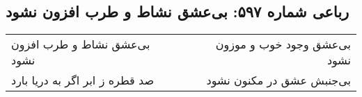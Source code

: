 \begin{center}
\section*{رباعی شماره ۵۹۷: بی‌عشق نشاط و طرب افزون نشود}
\label{sec:0597}
\begin{longtable}{l p{0.5cm} r}
بی‌عشق نشاط و طرب افزون نشود
&&
بی‌عشق وجود خوب و موزون نشود
\\
صد قطره ز ابر اگر به دریا بارد
&&
بی‌جنبش عشق در مکنون نشود
\\
\end{longtable}
\end{center}
